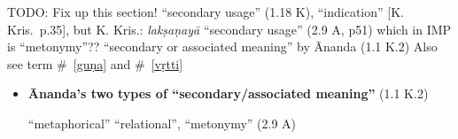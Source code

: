 \documentclass[10pt]{article}
\begin{document}
\begin{multicols}{2}
\begin{enumerate}[
			leftmargin=0em,
			rightmargin=0em,
		]

		 TODO: Fix up this section! ``secondary usage'' (1.18 K), ``indication'' [K. Kris.\ p.35],
		but K. Kris.: \textit{lakṣaṇayā} ``secondary usage'' (2.9 A, p51) which in IMP is ``metonymy''??
		``secondary or associated meaning'' by Ānanda (1.1 K.2)
		Also see term \#~\ref{guṇa} and \#~\ref{vṛtti}


		\begin{itemize}
			\item \textbf{Ānanda's two types of ``secondary\-/associated meaning''} (1.1 K.2)
			      \begin{enumerate}
				       ``metaphorical''
				       ``relational'', ``metonymy'' (2.9 A)
			      \end{enumerate}


\end{itemize}
\end{enumerate}
\end{multicols}
\end{document}

